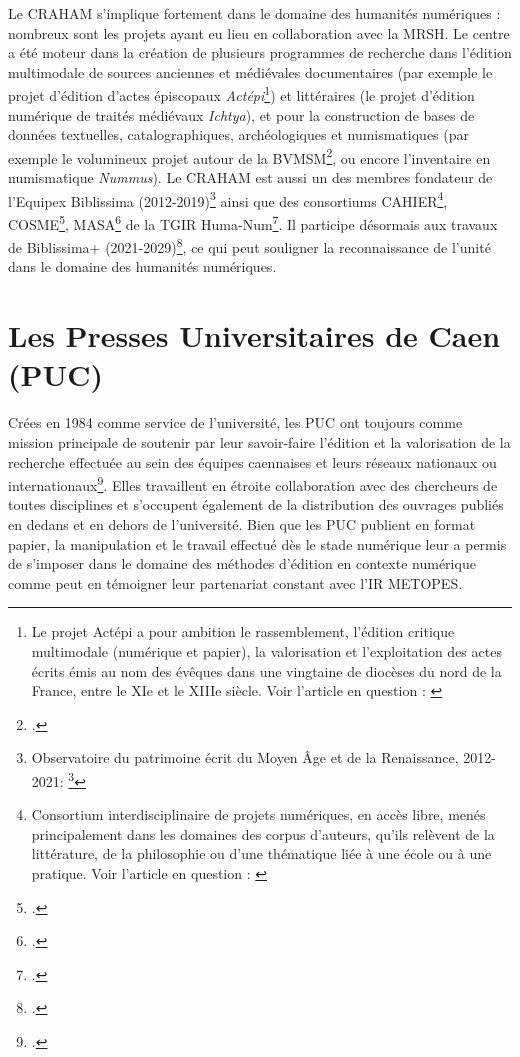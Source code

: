 \documentclass[a4paper,12pt,twoside]{book}
\begin{document}
    Le \acrshort{CRAHAM} s'implique fortement dans le domaine des humanités numériques : nombreux sont les projets ayant eu lieu en collaboration avec la \acrshort{MRSH}. Le centre a été moteur dans la création de \og plusieurs programmes de recherche dans l'édition multimodale de sources anciennes et médiévales documentaires (par exemple le projet d'édition d'actes épiscopaux \textit{Actépi}\footnote{Le projet Actépi a pour ambition le rassemblement, l’édition critique multimodale (numérique et papier), la valorisation et l’exploitation des actes écrits émis au nom des évêques dans une vingtaine de diocèses du nord de la France, entre le XIe et le XIIIe siècle. Voir l'article en question : \cite{actepi}}) et littéraires (le projet d'édition numérique de traités médiévaux \textit{Ichtya}), et pour la construction de bases de données textuelles, catalographiques, archéologiques et numismatiques (par exemple le volumineux projet autour de la \acrfull{BVMSM}\footcite{bvmsm}, ou encore l'inventaire en numismatique \textit{Nummus})\fg. Le \acrshort{CRAHAM} est aussi un des membres fondateur de l'Equipex Biblissima (2012-2019)\footnote{Observatoire du patrimoine écrit du Moyen Âge et de la Renaissance, 2012-2021: \footcite{Biblissima}} ainsi que des consortiums CAHIER\footnote{Consortium interdisciplinaire de projets numériques, en accès libre, menés principalement dans les domaines des \og corpus d'auteurs\fg, qu'ils relèvent de la littérature, de la philosophie ou d'une thématique liée à une école ou à une pratique. Voir l'article en question : \cite{consortium_cahier}}, COSME\footcite{consortium-cosme}, MASA\footcite{consortium-masa} de la \acrfull{TGIR} Huma-Num\footcite{huma-num}. Il participe désormais aux travaux de Biblissima+ (2021-2029)\footcite{Biblissima+}, ce qui peut souligner la reconnaissance de l'unité dans le domaine des humanités numériques.
    
    \section{Les Presses Universitaires de Caen (PUC)}
    
    Crées en 1984 comme service de l'université, les \acrshort{PUC} ont toujours comme mission principale de \og soutenir par leur savoir-faire l'édition et la valorisation de la recherche effectuée au sein des équipes caennaises et leurs réseaux nationaux ou internationaux\fg\footcite{PUC}. Elles travaillent en étroite collaboration avec des chercheurs de toutes disciplines et s'occupent également de la distribution des ouvrages publiés en dedans et en dehors de l'université. Bien que les \acrshort{PUC} publient en format papier, la manipulation et le travail effectué dès le stade numérique leur a permis de s'imposer dans le domaine des méthodes d'édition en contexte numérique comme peut en témoigner leur partenariat constant avec l'IR \acrshort{METOPES}.
\end{document}
